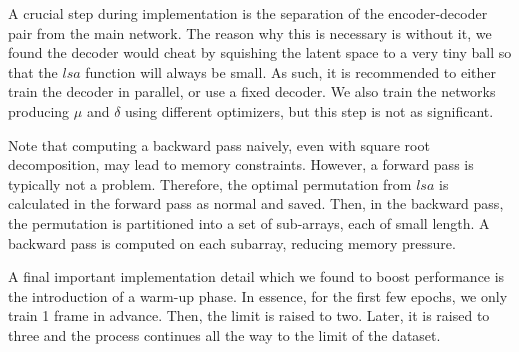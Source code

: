 \documentclass{article}
\begin{document}
A crucial step during implementation is the separation of the encoder-decoder pair from the main network. The reason why this is necessary is without it, we found the decoder would cheat by squishing the latent space to a very tiny ball so that the $lsa$ function will always be small. As such, it is recommended to either train the decoder in parallel, or use a fixed decoder. We also train the networks producing $\mu$ and $\delta$ using different optimizers, but this step is not as significant.
    
Note that computing a backward pass naively, even with square root decomposition, may lead to memory constraints. However, a forward pass is typically not a problem. Therefore, the optimal permutation from $lsa$ is calculated in the forward pass as normal and saved. Then, in the backward pass, the permutation is partitioned into a set of sub-arrays, each of small length. A backward pass is computed on each subarray, reducing memory pressure.

A final important implementation detail which we found to boost performance is the introduction of a warm-up phase. In essence, for the first few epochs, we only train 1 frame in advance. Then, the limit is raised to two. Later, it is raised to three and the process continues all the way to the limit of the dataset.
\end{document}
